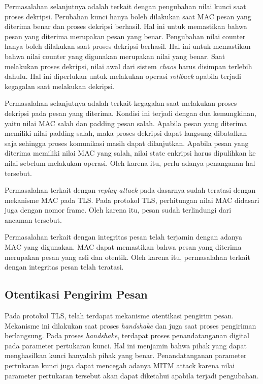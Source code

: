 Permasalahan selanjutnya adalah terkait dengan pengubahan nilai kunci saat proses dekripsi. Perubahan kunci hanya boleh dilakukan saat MAC pesan yang diterima benar dan proses dekripsi berhasil. Hal ini untuk memastikan bahwa pesan yang diterima merupakan pesan yang benar. Pengubahan nilai counter hanya boleh dilakukan saat proses dekripsi berhasil. Hal ini untuk memastikan bahwa nilai counter yang digunakan merupakan nilai yang benar. Saat melakukan proses dekripsi, nilai awal dari sistem \emph{chaos} harus disimpan terlebih dahulu. Hal ini diperlukan untuk melakukan operasi \emph{rollback} apabila terjadi kegagalan saat melakukan dekripsi.

Permasalahan selanjutnya adalah terkait kegagalan saat melakukan proses dekripsi pada pesan yang diterima. Kondisi ini terjadi dengan dua kemungkinan, yaitu nilai MAC salah dan padding pesan salah. Apabila pesan yang diterima memiliki nilai padding salah, maka proses dekripsi dapat langsung dibatalkan saja sehingga proses komunikasi masih dapat dilanjutkan. Apabila pesan yang diterima memiliki nilai MAC yang salah, nilai state enkripsi harus dipulihkan ke nilai sebelum melakukan operasi. Oleh karena itu, perlu adanya penanganan hal tersebut.

Permasalahan terkait dengan \emph{replay attack} pada dasarnya sudah teratasi dengan mekanisme MAC pada TLS. Pada protokol TLS, perhitungan nilai MAC didasari juga dengan nomor frame. Oleh karena itu, pesan sudah terlindungi dari ancaman tersebut.

Permasalahan terkait dengan integritas pesan telah terjamin dengan adanya MAC yang digunakan. MAC dapat memastikan bahwa pesan yang diterima merupakan pesan yang asli dan otentik. Oleh karena itu, permasalahan terkait dengan integritas pesan telah teratasi.

\subsection{Otentikasi Pengirim Pesan}

Pada protokol TLS, telah terdapat mekanisme otentikasi pengirim pesan. Mekanisme ini dilakukan saat proses \emph{handshake} dan juga saat proses pengiriman berlangsung. Pada proses \emph{handshake}, terdapat proses penandatanganan digital pada parameter pertukaran kunci. Hal ini menjamin bahwa pihak yang dapat menghasilkan kunci hanyalah pihak yang benar. Penandatanganan parameter pertukaran kunci juga dapat mencegah adanya MITM attack karena nilai parameter pertukaran tersebut akan dapat diketahui apabila terjadi pengubahan.

